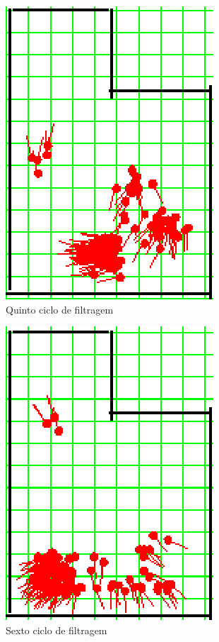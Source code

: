 \begin{figure}[H]
  \centering
  \includegraphics[scale=0.6]{figuras/cen1_ex1/6.eps}
  \caption[Quinto Ciclo de Filtragem]{Quinto ciclo de filtragem}
  \label{img:cen1_ex1_6}
\end{figure}

\begin{figure}[H]
  \centering
  \includegraphics[scale=0.6]{figuras/cen1_ex1/7.eps}
  \caption[Sexto Ciclo de Filtragem]{Sexto ciclo de filtragem}
  \label{img:cen1_ex1_7}
\end{figure}

